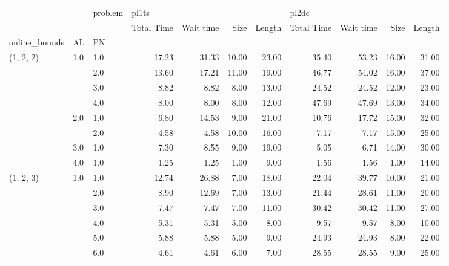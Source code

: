 \begin{tabular}{lllrrrrrrrr}
\toprule
          &     & problem & \multicolumn{4}{l}{pl1ts} & \multicolumn{4}{l}{pl2dc} \\
          &     & {} & Total Time & Wait time &  Size & Length & Total Time & Wait time &  Size & Length \\
online\_bounds & AL & PN &            &           &       &        &            &           &       &        \\
\midrule
(1, 2, 2) & 1.0 & 1.0  &      17.23 &     31.33 & 10.00 &  23.00 &      35.40 &     53.23 & 16.00 &  31.00 \\
          &     & 2.0  &      13.60 &     17.21 & 11.00 &  19.00 &      46.77 &     54.02 & 16.00 &  37.00 \\
          &     & 3.0  &       8.82 &      8.82 &  8.00 &  13.00 &      24.52 &     24.52 & 12.00 &  23.00 \\
          &     & 4.0  &       8.00 &      8.00 &  8.00 &  12.00 &      47.69 &     47.69 & 13.00 &  34.00 \\
          & 2.0 & 1.0  &       6.80 &     14.53 &  9.00 &  21.00 &      10.76 &     17.72 & 15.00 &  32.00 \\
          &     & 2.0  &       4.58 &      4.58 & 10.00 &  16.00 &       7.17 &      7.17 & 15.00 &  25.00 \\
          & 3.0 & 1.0  &       7.30 &      8.55 &  9.00 &  19.00 &       5.05 &      6.71 & 14.00 &  30.00 \\
          & 4.0 & 1.0  &       1.25 &      1.25 &  1.00 &   9.00 &       1.56 &      1.56 &  1.00 &  14.00 \\
(1, 2, 3) & 1.0 & 1.0  &      12.74 &     26.88 &  7.00 &  18.00 &      22.04 &     39.77 & 10.00 &  21.00 \\
          &     & 2.0  &       8.90 &     12.69 &  7.00 &  13.00 &      21.44 &     28.61 & 11.00 &  20.00 \\
          &     & 3.0  &       7.47 &      7.47 &  7.00 &  11.00 &      30.42 &     30.42 & 11.00 &  27.00 \\
          &     & 4.0  &       5.31 &      5.31 &  5.00 &   8.00 &       9.57 &      9.57 &  8.00 &  10.00 \\
          &     & 5.0  &       5.88 &      5.88 &  5.00 &   9.00 &      24.93 &     24.93 &  8.00 &  22.00 \\
          &     & 6.0  &       4.61 &      4.61 &  6.00 &   7.00 &      28.55 &     28.55 &  9.00 &  25.00 \\

\end{tabular}

